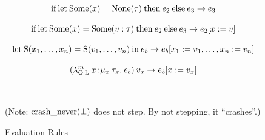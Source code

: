 \begin{figure}
{\[
\textrm{if}\:\textrm{let}\:\textrm{Some}(x) = \textrm{None}(\tau)\: \textrm{then}\: e_2\: \textrm{else}\: e_3 \rightarrow e_3
\]

\[
\textrm{if}\:\textrm{let}\:\textrm{Some}(x) = \textrm{Some}(v: \tau)\: \textrm{then}\: e_2\: \textrm{else}\: e_3 \rightarrow e_2 [ x := v ]
\]

\[
\textrm{let}\: \textrm{S}(x_1,\ldots,x_n) = {\textrm{S}(v_1,\ldots,v_n)}\:\textrm{in}\:{e_b}
\rightarrow e_b [ x_1 := v_1, \ldots, x_n := v_n ]
\]

\[
(\lambda^{m}_{\textrm{O}\: \textrm{L}}\:x\!:\! \mu_x\: \tau_x.\: e_b)\: v_x \rightarrow e_b [ x := v_x ]
\]

$ $

(Note: $\textrm{crash\_never}(\bot)$ does not step.  By not stepping, it ``crashes''.)

}

\caption{Evaluation Rules}
\label{fig:formal:evaluation}
\end{figure}


